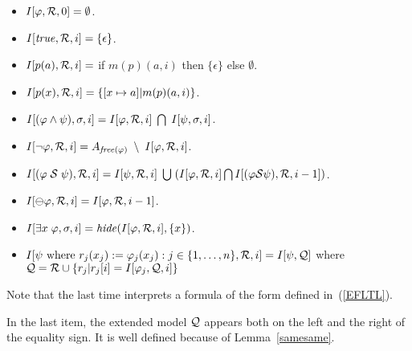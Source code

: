 \documentclass{llncs}
\begin{document}
\begin{itemize}
\item $I [ \varphi , {\cal R} , 0 ] = \emptyset$.
\item $I [ \mathit{true} , {\cal R} , i ] = \{ \epsilon \}$.
\item $I [ p ( a ) , {\cal R} , i ] =$ if $m (p )  ( a , i ) $ then
$\{ \epsilon \}$ else $\emptyset$.
\item $I [ p ( x ) , {\cal R} , i ] = \{ [ x \mapsto a ] | m (p) ( a , i)  \}$.
\item $I [ ( \varphi \wedge \psi ) , \sigma , i ] = 
I [ \varphi , {\cal R} , i ] \;  \bigcap \; I [ \psi , \sigma , i ]$.
\item $I [ \neg \varphi , {\cal R} , i ] = 
A_{\mathit{free} ( \varphi )} \; \setminus \; I [ \varphi , {\cal R} , i ]$.
\item $I [ ( \varphi \; {\cal S} \; \psi ) , {\cal R} , i ] = 
I [ \psi , {\cal R}, i ] \; \bigcup \;
( I [ \varphi , {\cal R} , i ] \bigcap 
I [ (\varphi {\cal S} \psi ) , {\cal R} , i - 1 ] )$.
\item $I [ \ominus \varphi , {\cal R} , i ] = I [ \varphi , {\cal R} , i-1 ]$.
\item $I [ \exists x \; \varphi , \sigma , i ] = 
\mathit{hide} ( I [ \varphi , {\cal R} , i ] , \{ x \} )$.
\item $I [ \psi \mathrm{\ where\ } r_j ( x_j) := 
\varphi_j (x_j) : j \in \{ 1 , \ldots , n \} , {\cal R} , i ] = 
 I [ \psi , {\cal Q} ] $ where ${\cal Q} = {\cal R} \cup
\{ r_j | r_j [ i ] =  I [ 
\varphi_j , {\cal Q} , i ] \}$
\end{itemize}
Note that the last time interprets a formula of
the form defined in~(\ref{EFLTL}).




In the last item, the extended model ${\cal Q}$ appears both on the left and the right of the equality sign. It is well defined because of Lemma~\ref{samesame}.
\end{document}
